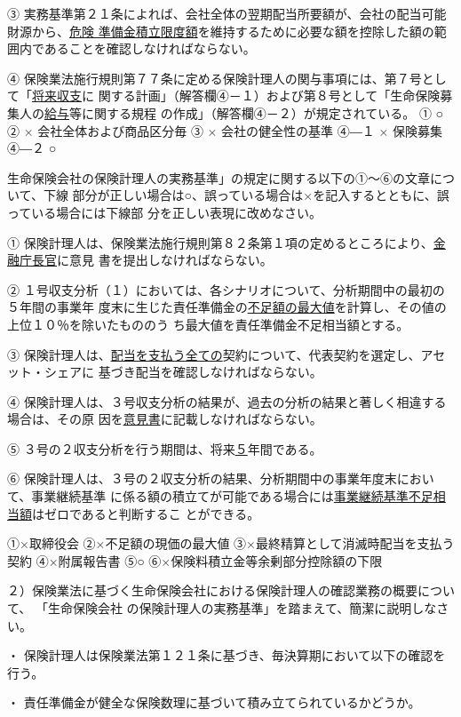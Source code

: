 \documentclass[report,gutter=10mm,fore-edge=10mm,uplatex,dvipdfmx]{jlreq}
\begin{document}
③ 実務基準第２１条によれば、会社全体の翌期配当所要額が、会社の配当可能財源から、\underline{危険
準備金積立限度額}を維持するために必要な額を控除した額の範囲内であることを確認しなければならない。

④ 保険業法施行規則第７７条に定める保険計理人の関与事項には、第７号として「\underline{将来収支}に
関する計画」（解答欄④－１）および第８号として「生命保険募集人の\underline{給与}等に関する規程
の作成」（解答欄④－２）が規定されている。
\answer{}
① ○ 
② × 会社全体および商品区分毎 
③ × 会社の健全性の基準 
④―１ × 保険募集 
④―２ ○ 

生命保険会社の保険計理人の実務基準」の規定に関する以下の①～⑥の文章について、下線
部分が正しい場合は○、誤っている場合は×を記入するとともに、誤っている場合には下線部
分を正しい表現に改めなさい。

① 保険計理人は、保険業法施行規則第８２条第１項の定めるところにより、\underline{金融庁長官}に意見
書を提出しなければならない。

② １号収支分析（１）においては、各シナリオについて、分析期間中の最初の５年間の事業年
度末に生じた責任準備金の\underline{不足額の最大値}を計算し、その値の上位１０％を除いたもののう
ち最大値を責任準備金不足相当額とする。

③ 保険計理人は、\underline{配当を支払う全ての}契約について、代表契約を選定し、アセット・シェアに
基づき配当を確認しなければならない。

④ 保険計理人は、３号収支分析の結果が、過去の分析の結果と著しく相違する場合は、その原
因を\underline{意見書}に記載しなければならない。

⑤ ３号の２収支分析を行う期間は、将来\underline{５}年間である。

⑥ 保険計理人は、３号の２収支分析の結果、分析期間中の事業年度末において、事業継続基準
に係る額の積立てが可能である場合には\underline{事業継続基準不足相当額}はゼロであると判断するこ
とができる。

\answer{}

①×取締役会
②×不足額の現価の最大値
③×最終精算として消滅時配当を支払う契約
④×附属報告書
⑤○
⑥×保険料積立金等余剰部分控除額の下限

２）保険業法に基づく生命保険会社における保険計理人の確認業務の概要について、
「生命保険会社
の保険計理人の実務基準」を踏まえて、簡潔に説明しなさい。

\answer{}

・ 保険計理人は保険業法第１２１条に基づき、毎決算期において以下の確認を行う。

・ 責任準備金が健全な保険数理に基づいて積み立てられているかどうか。
\end{document}
